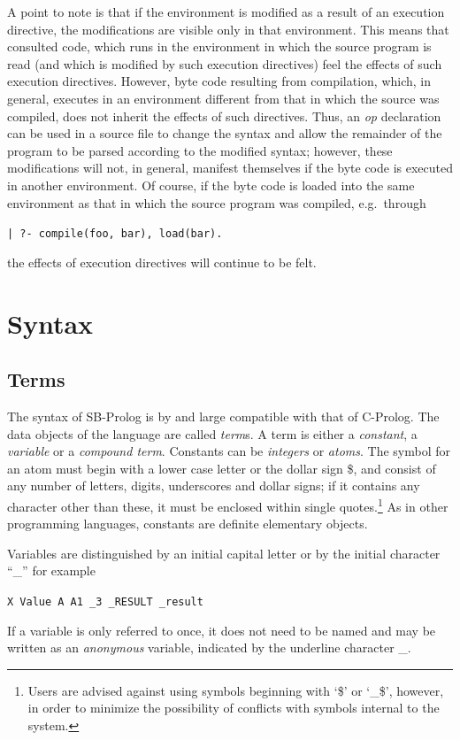 A point to note is that if the environment is modified as a result of an
execution directive, the modifications are visible only in that environment.
This means that consulted code, which runs in the environment in which
the source program is read
(and which is modified by such execution directives) feel the effects of such
execution directives.
However, byte code resulting from compilation, which, in general,
executes in an environment different from that in which the source was compiled,
does not inherit the effects of such directives.
Thus, an {\em op} declaration can be used in a source file to change the syntax
and allow the remainder of the program to be parsed according to the modified
syntax; however, these modifications will not, in general, manifest themselves
if the byte code is executed in another environment.
Of course, if the byte code is loaded into the same environment as that in
which the source program was compiled, e.g.\ through
\begin{center}
{\tt | ?- compile(foo, bar), load(bar).}
\end{center}
the effects of execution directives will continue to be felt.

\section{Syntax}

\subsection{Terms}\label{terms}
The syntax of SB-Prolog is by and large compatible with that of C-Prolog.
The data objects of the language are called {\em term}s.
A term is either a {\em constant}, a {\em variable} or a {\em compound term}.
Constants can be {\em integers}
or {\em atoms}.
The symbol for an atom must begin with a lower case letter or the dollar
sign \$, and consist of any number of letters, digits, underscores
and dollar signs; if it contains any character other than these, it must be
enclosed within single quotes.\footnote{
    Users are advised against using symbols beginning with `\$' or `\_\$',
    however, in order to minimize the possibility of conflicts with symbols
    internal to the system.}
As in other programming languages, constants are definite elementary objects.

Variables are distinguished by an initial capital letter or by
the initial character ``\_'' for example
\begin{center}
{\tt X   Value   A   A1   \_3   \_RESULT   \_result}
\end{center}
If a variable is only referred to once, it does not need to be named
and may be written as an {\em anonymous} variable, indicated by the
underline character \_.

